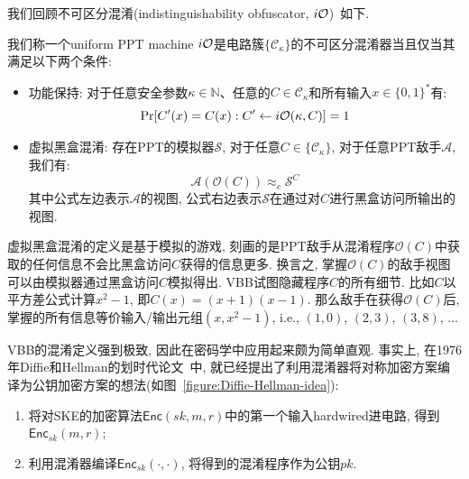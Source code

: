 我们回顾不可区分混淆(indistinguishability obfuscator, $i\mathcal{O}$)~\cite{Garg-FOCS-2013}如下. 
\begin{definition}[虚拟黑盒混淆]
我们称一个uniform PPT machine $i\mathcal{O}$是电路簇$\{\mathcal{C}_\kappa\}$的不可区分混淆器当且仅当其满足以下两个条件:
\begin{itemize}
\item 功能保持: 对于任意安全参数$\kappa \in \mathbb{N}$、任意的$C \in \mathcal{C}_\kappa$和所有输入$x \in \{0,1\}^*$有:
    \begin{equation*}
        \Pr[C'(x) = C(x): C' \leftarrow i\mathcal{O}(\kappa, C)] = 1
    \end{equation*} 

\item 虚拟黑盒混淆: 存在PPT的模拟器$\mathcal{S}$, 对于任意$C \in \{\mathcal{C}_\kappa\}$, 对于任意PPT敌手$\mathcal{A}$, 
	我们有: 
    \begin{equation*}
        \mathcal{A}(\mathcal{O}(C)) \approx_c \mathcal{S}^{C}
    \end{equation*}   
    其中公式左边表示$\mathcal{A}$的视图, 公式右边表示$\mathcal{S}$在通过对$C$进行黑盒访问所输出的视图. 
\end{itemize} 
\end{definition}

\begin{note}
虚拟黑盒混淆的定义是基于模拟的游戏, 刻画的是PPT敌手从混淆程序$\mathcal{O}(C)$中获取的任何信息不会比黑盒访问$C$获得的信息更多. 
换言之, 掌握$\mathcal{O}(C)$的敌手视图可以由模拟器通过黑盒访问$C$模拟得出. 
VBB试图隐藏程序$C$的所有细节. 比如$C$以平方差公式计算$x^2-1$, 即$C(x) = (x+1)(x-1)$. 
那么敌手在获得$\mathcal{O}(C)$后, 掌握的所有信息等价输入/输出元组$(x, x^2-1)$, i.e., $(1, 0)$, $(2, 3)$, $(3, 8)$, $\dots$
\end{note}

VBB的混淆定义强到极致, 因此在密码学中应用起来颇为简单直观. 
事实上, 在1976年Diffie和Hellman的划时代论文~\cite{DH-IEEE-IT-1976}中, 
就已经提出了利用混淆器将对称加密方案编译为公钥加密方案的想法(如图~\ref{figure:Diffie-Hellman-idea}): 
\begin{enumerate}
    \item 将对SKE的加密算法$\mathsf{Enc}(sk, m, r)$中的第一个输入hardwired进电路, 得到$\mathsf{Enc}_{sk}(m, r)$; 
    \item 利用混淆器编译$\mathsf{Enc}_{sk}(\cdot, \cdot)$, 将得到的混淆程序作为公钥$pk$.
\end{enumerate}

